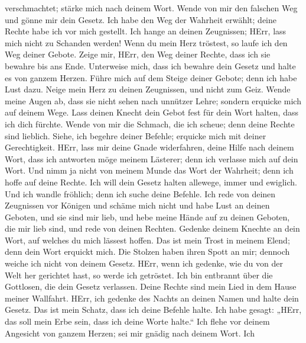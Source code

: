 verschmachtet; stärke mich nach deinem Wort.  Wende von mir
den falschen Weg und gönne mir dein Gesetz.  Ich habe den
Weg der Wahrheit erwählt; deine Rechte habe ich vor mich gestellt.
 Ich hange an deinen Zeugnissen; HErr, lass mich nicht zu
Schanden werden!  Wenn du mein Herz tröstest, so laufe ich
den Weg deiner Gebote.  Zeige mir, HErr, den Weg deiner
Rechte, dass ich sie bewahre bis ans Ende.  Unterweise
mich, dass ich bewahre dein Gesetz und halte es von ganzem Herzen.
 Führe mich auf dem Steige deiner Gebote; denn ich habe
Lust dazu.  Neige mein Herz zu deinen Zeugnissen, und nicht
zum Geiz.  Wende meine Augen ab, dass sie nicht sehen nach
unnützer Lehre; sondern erquicke mich auf deinem Wege. 
Lass deinen Knecht dein Gebot fest für dein Wort halten, dass ich dich
fürchte.  Wende von mir die Schmach, die ich scheue; denn
deine Rechte sind lieblich.  Siehe, ich begehre deiner
Befehle; erquicke mich mit deiner Gerechtigkeit.  HErr,
lass mir deine Gnade widerfahren, deine Hilfe nach deinem Wort,
 dass ich antworten möge meinem Lästerer; denn ich verlasse
mich auf dein Wort.  Und nimm ja nicht von meinem Munde das
Wort der Wahrheit; denn ich hoffe auf deine Rechte.  Ich
will dein Gesetz halten allewege, immer und ewiglich.  Und
ich wandle fröhlich; denn ich suche deine Befehle.  Ich
rede von deinen Zeugnissen vor Königen und schäme mich nicht
 und habe Lust an deinen Geboten, und sie sind mir lieb,
 und hebe meine Hände auf zu deinen Geboten, die mir lieb
sind, und rede von deinen Rechten.  Gedenke deinem Knechte
an dein Wort, auf welches du mich lässest hoffen.  Das ist
mein Trost in meinem Elend; denn dein Wort erquickt mich. 
Die Stolzen haben ihren Spott an mir; dennoch weiche ich nicht von
deinem Gesetz.  HErr, wenn ich gedenke, wie du von der Welt
her gerichtet hast, so werde ich getröstet.  Ich bin
entbrannt über die Gottlosen, die dein Gesetz verlassen. 
Deine Rechte sind mein Lied in dem Hause meiner Wallfahrt. 
HErr, ich gedenke des Nachts an deinen Namen und halte dein Gesetz.
 Das ist mein Schatz, dass ich deine Befehle halte.
 Ich habe gesagt: „HErr, das soll mein Erbe sein, dass ich
deine Worte halte.``  Ich flehe vor deinem Angesicht von
ganzem Herzen; sei mir gnädig nach deinem Wort.  Ich
